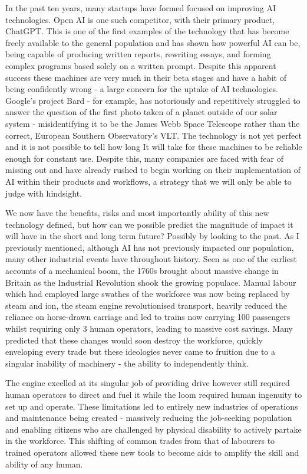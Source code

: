 In the past ten years, many startups have formed focused on improving AI technologies. Open AI is one such competitor, with their primary product, ChatGPT. This is one of the first examples of the technology that has become freely available to the general population and has shown how powerful AI can be, being capable of producing written reports, rewriting essays, and forming complex programs based solely on a written prompt. Despite this apparent success these machines are very much in their beta stages and have a habit of being confidently wrong - a large concern for the uptake of AI technologies. Google's project Bard - for example, has notoriously and repetitively struggled to answer the question of the first photo taken of a planet outside of our solar system - misidentifying it to be the James Webb Space Telescope rather than the correct, European Southern Observatory's VLT. The technology is not yet perfect and it is not possible to tell how long It will take for these machines to be reliable enough for constant use. Despite this, many companies are faced with fear of missing out and have already rushed to begin working on their implementation of AI within their products and workflows, a strategy that we will only be able to judge with hindsight.

We now have the benefits, risks and most importantly ability of this new technology defined, but how can we possible predict the magnitude of impact it will have in the short and long term future? Possibly by looking to the past. As I previously mentioned, although AI has not previously impacted our population, many other industrial events have throughout history. Seen as one of the earliest accounts of a mechanical boom, the 1760s brought about massive change in Britain as the Industrial Revolution shook the growing populace. Manual labour which had employed large swathes of the workforce was now being replaced by steam and ion, the steam engine revolutionised transport, heavily reduced the reliance on horse-drawn carriage and led to trains now carrying 100 passengers whilst requiring only 3 human operators, leading to massive cost savings. Many predicted that these changes would soon destroy the workforce, quickly enveloping every trade but these ideologies never came to fruition due to a singular inability of machinery - the ability to independently think.

The engine excelled at its singular job of providing drive however still required human operators to direct and fuel it while the loom required human ingenuity to set up and operate. These limitations led to entirely new industries of operations and maintenance being created - massively reducing the job-seeking population and enabling citizens who are challenged by physical disability to actively partake in the workforce. This shifting of common trades from that of labourers to trained operators allowed these new tools to become aids to amplify the skill and ability of any human.

